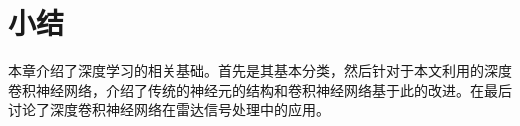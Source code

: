 
\section{小结}
本章介绍了深度学习的相关基础。首先是其基本分类，然后针对于本文利用的深度卷积神经网络，介绍了传统的神经元的结构和卷积神经网络基于此的改进。在最后讨论了深度卷积神经网络在雷达信号处理中的应用。

